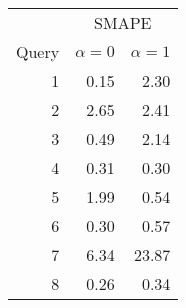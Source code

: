 \begin{tabular}{rrr}
\toprule
       &  \multicolumn{2}{c}{SMAPE} \\
 Query &  $\alpha = 0$ &  $\alpha = 1$ \\
\midrule
     1 &  0.15         &  2.30 \\
     2 &  2.65         &  2.41 \\
     3 &  0.49         &  2.14 \\
     4 &  0.31         &  0.30 \\
     5 &  1.99         &  0.54 \\
     6 &  0.30         &  0.57 \\
     7 &  6.34         &  23.87 \\
     8 &  0.26         &  0.34 \\
\bottomrule
\end{tabular}
